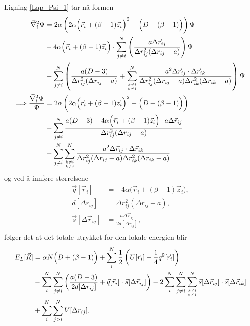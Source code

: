 \documentclass[pdftex,10pt,b5paper,twoside]{book}
\begin{document}
Ligning \eqref{Lap_Psi_1} tar nå formen
\begin{align}
\vec{\nabla}_i^2\Psi &= 2\alpha\left(2\alpha\Big(\vec{r}_i+(\beta-1)\vec{z}_i\Big)^2-\Big(D+(\beta-1)\Big)\right) \Psi \nonumber\\
&- 4\alpha\Big(\vec{r}_i+(\beta-1)\vec{z}_i\Big) \cdot \sum\limits_{j \neq i}^N \left(\frac{a\Delta\vec{r}_{ij}}{\Delta{r}_{ij}^2(\Delta{r}_{ij}-a)}\right) \Psi \nonumber\\
&+ \sum\limits_{j \neq i}^N \left(\frac{a(D-3)}{\Delta{r}_{ij}^2(\Delta{r}_{ij}-a)} + \sum\limits_{{k \neq i}\atop{k \neq j}}^N \frac{a^2 \Delta\vec{r}_{ij} \cdot \Delta\vec{r}_{ik}}{\Delta{r}_{ij}^2(\Delta{r}_{ij}-a) \Delta{r}_{ik}^2(\Delta{r}_{ik}-a)}\right) \Psi \nonumber\\
\Longrightarrow \frac{\vec{\nabla}_i^2\Psi}{\Psi} &= 2\alpha\left(2\alpha\Big(\vec{r}_i+(\beta-1)\vec{z}_i\Big)^2-\Big(D+(\beta-1)\Big)\right) \nonumber\\
&+ \sum\limits_{j \neq i}^N \frac{a(D-3) - 4\alpha\Big(\vec{r}_i+(\beta-1)\vec{z}_i\Big) \cdot a\Delta\vec{r}_{ij}}{\Delta{r}_{ij}^2(\Delta{r}_{ij}-a)} \nonumber\\
&+ \sum\limits_{j \neq i}^N \sum\limits_{{k \neq i}\atop{k \neq j}}^N \frac{a^2 \Delta\vec{r}_{ij} \cdot \Delta\vec{r}_{ik}}{\Delta{r}_{ij}^2(\Delta{r}_{ij}-a) \Delta{r}_{ik}^2(\Delta{r}_{ik}-a)}
\end{align}
og ved å innføre størrelsene
\begin{align}
\vec{q}[\vec{r}_i] &= -4\alpha\Big(\vec{r}_i+(\beta-1)\vec{z}_i\Big), \\
d[\Delta{r}_{ij}] &= \Delta{r}_{ij}^2(\Delta{r}_{ij}-a), \\
\vec{s}[\Delta\vec{r}_{ij}] &= \frac{a\Delta\vec{r}_{ij}}{2d[\Delta{r}_{ij}]}, \\
\end{align}
følger det at det totale utrykket for den lokale energien blir
\begin{align}
E_L[\vec{R}] &= \alpha N\Big(D+(\beta-1)\Big) + \sum\limits_i^N \frac{1}{2}\left( U[\vec{r}_i] - \frac{1}{4}\vec{q}^2[\vec{r}_i] \right) \nonumber\\
&- \sum\limits_i^N \sum\limits_{j \neq i}^N \left( \frac{a(D-3)}{2d[\Delta{r}_{ij}]} + \vec{q}[\vec{r}_i] \cdot \vec{s}[\Delta\vec{r}_{ij}] \right) - 2\sum\limits_i^N \sum\limits_{j \neq i}^N \sum\limits_{{k \neq i}\atop{k \neq j}}^N \vec{s}[\Delta\vec{r}_{ij}] \cdot \vec{s}[\Delta\vec{r}_{ik}] \nonumber\\
&+ \sum\limits_i^N \sum_{j>i}^N V[\Delta{r}_{ij}].
\end{align}
\end{document}
